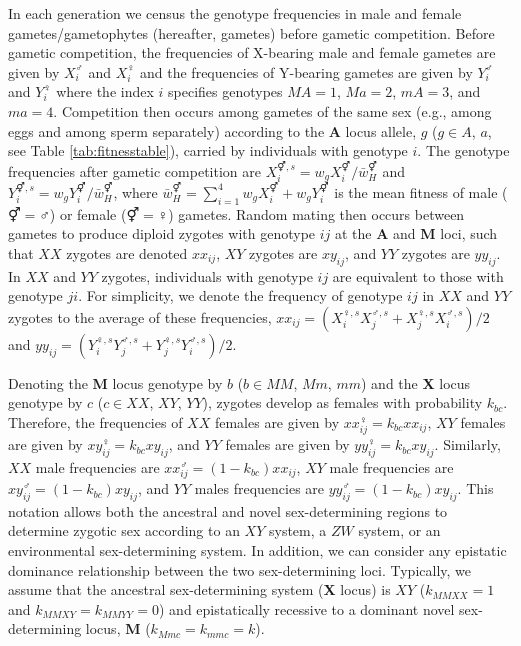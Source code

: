 \documentclass[12pt]{article}
\begin{document}
In each generation we census the genotype frequencies in male and female gametes/gametophytes (hereafter, gametes) before gametic competition. 
Before gametic competition, the frequencies of X-bearing male and female gametes are given by $X_{i}^{\male}$ and $X_{i}^{\female}$ and the frequencies of Y-bearing gametes are given by $Y_{i}^{\male}$ and $Y_{i}^{\female}$ where the index $i$ specifies genotypes $MA=1$, $Ma=2$, $mA=3$, and $ma=4$. 
Competition then occurs among gametes of the same sex (e.g., among eggs and among sperm separately) according to the \textbf{A} locus allele, $g$ ($g\in A$, $a$, see Table \ref{tab:fitnesstable}), carried by individuals with genotype $i$.
The genotype frequencies after gametic competition are $X_{i}^{\Hermaphrodite,s}= w_{g}X_{i}^{\Hermaphrodite}/\bar{w}_{H}^{\Hermaphrodite}$ and $Y_{i}^{\Hermaphrodite,s}= w_{g}Y_{i}^{\Hermaphrodite}/\bar{w}_{H}^{\Hermaphrodite}$, where $\bar{w}_{H}^{\Hermaphrodite}=\sum_{i=1}^{4} w_{g}X_{i}^{\Hermaphrodite}+w_{g}Y_{i}^{\Hermaphrodite}$ is the mean fitness of male ($\Hermaphrodite=\male$) or female ($\Hermaphrodite=\female$) gametes. 
Random mating then occurs between gametes to produce diploid zygotes with genotype $ij$ at the \textbf{A} and \textbf{M} loci, such that $XX$ zygotes are denoted $xx_{ij}$, $XY$ zygotes are $xy_{ij}$, and $YY$ zygotes are $yy_{ij}$. 
In $XX$ and $YY$ zygotes, individuals with genotype $ij$ are equivalent to those with genotype $ji$. 
For simplicity, we denote the frequency of genotype $ij$ in $XX$ and $YY$ zygotes to the average of these frequencies, $xx_{ij}=(X_{i}^{\female,s}X_{j}^{\male,s}+X_{j}^{\female,s}X_{i}^{\male,s})/2$ and $yy_{ij}=(Y_{i}^{\female,s}Y_{j}^{\male,s}+Y_{j}^{\female,s}Y_{i}^{\male,s})/2$. 

Denoting the \textbf{M} locus genotype by $b$ ($b\in MM$, $Mm$, $mm$) and the \textbf{X} locus genotype by $c$ ($c\in XX$, $XY$, $YY$), zygotes develop as females with probability $k_{bc}$. 
Therefore, the frequencies of $XX$ females are given by $xx_{ij}^{\female}=k_{bc}xx_{ij}$, $XY$ females are given by $xy_{ij}^{\female}=k_{bc}xy_{ij}$, and $YY$ females are given by $yy_{ij}^{\female}=k_{bc}xy_{ij}$. 
Similarly, $XX$ male frequencies are $xx_{ij}^{\male}=(1-k_{bc})xx_{ij}$, $XY$ male frequencies are $xy_{ij}^{\male}=(1-k_{bc})xy_{ij}$, and $YY$ males frequencies are $yy_{ij}^{\male}=(1-k_{bc})xy_{ij}$.
This notation allows both the ancestral and novel sex-determining regions to determine zygotic sex according to an $XY$ system, a $ZW$ system, or an environmental sex-determining system. 
In addition, we can consider any epistatic dominance relationship between the two sex-determining loci. 
Typically, we assume that the ancestral sex-determining system (\textbf{X} locus) is $XY$ ($k_{MMXX}=1$ and $k_{MMXY}=k_{MMYY}=0$) and epistatically recessive to a dominant novel sex-determining locus, \textbf{M} ($k_{Mmc}=k_{mmc}=k$). 
\end{document}
